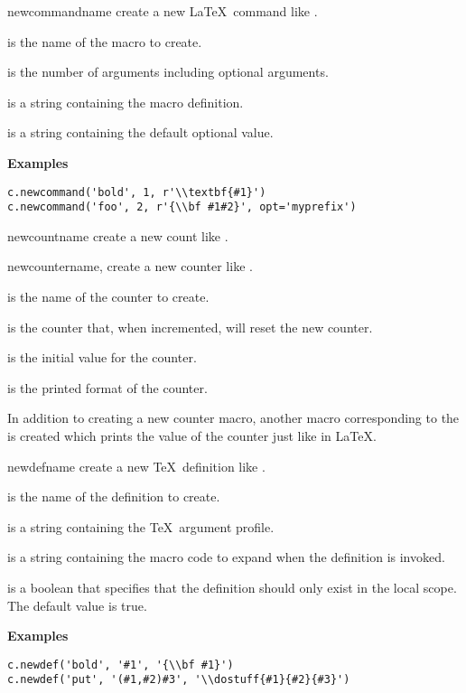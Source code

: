 \begin{methoddesc}[Context]{newcommand}{name}
create a new \LaTeX\ command like .

 is the name of the macro to create.

 is the number of arguments including optional arguments.

 is a string containing the macro definition.

 is a string containing the default optional value.

\textbf{Examples}
\begin{verbatim}
c.newcommand('bold', 1, r'\\textbf{#1}')
c.newcommand('foo', 2, r'{\\bf #1#2}', opt='myprefix')
\end{verbatim}
\end{methoddesc}

\begin{methoddesc}[Context]{newcount}{name}
create a new count like .
\end{methoddesc}

\begin{methoddesc}[Context]{newcounter}{name, }
create a new counter like .

 is the name of the counter to create.

 is the counter that, when incremented, will reset the 
new counter.

 is the initial value for the counter.

 is the printed format of the counter.

In addition to creating a new counter macro, another macro corresponding
to the  is created which prints the value of the
counter just like in \LaTeX.
\end{methoddesc}

\begin{methoddesc}[Context]{newdef}{name}
create a new \TeX\ definition like .

 is the name of the definition to create.

 is a string containing the \TeX\ argument profile.

 is a string containing the macro code to expand when the
definition is invoked.

 is a boolean that specifies that the definition should only
exist in the local scope.  The default value is true.

\textbf{Examples}
\begin{verbatim}
c.newdef('bold', '#1', '{\\bf #1}')
c.newdef('put', '(#1,#2)#3', '\\dostuff{#1}{#2}{#3}')
\end{verbatim}
\end{methoddesc}

